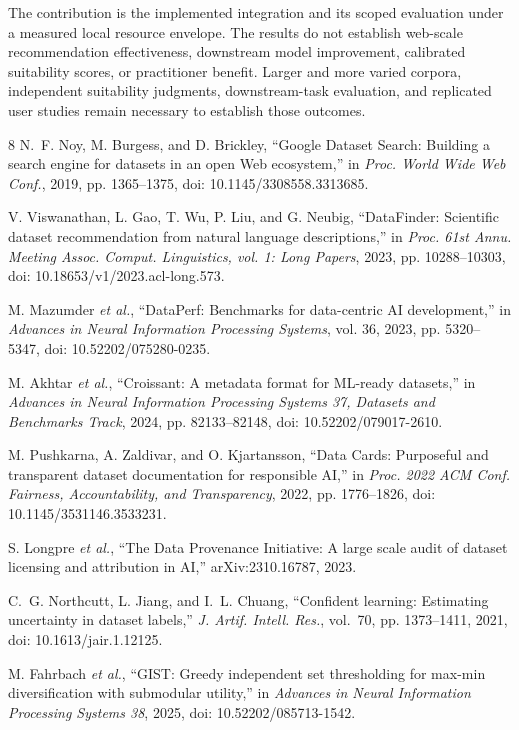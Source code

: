 \documentclass[conference]{IEEEtran}
\begin{document}
The contribution is the implemented integration and its scoped evaluation under a measured local resource envelope. The results do not establish web-scale recommendation effectiveness, downstream model improvement, calibrated suitability scores, or practitioner benefit. Larger and more varied corpora, independent suitability judgments, downstream-task evaluation, and replicated user studies remain necessary to establish those outcomes.

\begin{thebibliography}{8}
N.~F. Noy, M. Burgess, and D. Brickley, ``Google Dataset Search: Building a
search engine for datasets in an open Web ecosystem,'' in \emph{Proc. World
Wide Web Conf.}, 2019, pp. 1365--1375, doi: 10.1145/3308558.3313685.

V. Viswanathan, L. Gao, T. Wu, P. Liu, and G. Neubig, ``DataFinder:
Scientific dataset recommendation from natural language descriptions,'' in
\emph{Proc. 61st Annu. Meeting Assoc. Comput. Linguistics, vol. 1: Long
Papers}, 2023, pp. 10288--10303, doi: 10.18653/v1/2023.acl-long.573.

M. Mazumder \emph{et al.}, ``DataPerf: Benchmarks for data-centric AI
development,'' in \emph{Advances in Neural Information Processing Systems},
vol. 36, 2023, pp. 5320--5347, doi: 10.52202/075280-0235.

M. Akhtar \emph{et al.}, ``Croissant: A metadata format for ML-ready
datasets,'' in \emph{Advances in Neural Information Processing Systems 37,
Datasets and Benchmarks Track}, 2024, pp. 82133--82148, doi:
10.52202/079017-2610.

M. Pushkarna, A. Zaldivar, and O. Kjartansson, ``Data Cards: Purposeful and
transparent dataset documentation for responsible AI,'' in \emph{Proc. 2022
ACM Conf. Fairness, Accountability, and Transparency}, 2022, pp. 1776--1826,
doi: 10.1145/3531146.3533231.

S. Longpre \emph{et al.}, ``The Data Provenance Initiative: A large scale
audit of dataset licensing and attribution in AI,'' arXiv:2310.16787, 2023.

C.~G. Northcutt, L. Jiang, and I.~L. Chuang, ``Confident learning: Estimating
uncertainty in dataset labels,'' \emph{J. Artif. Intell. Res.}, vol.~70,
pp. 1373--1411, 2021, doi: 10.1613/jair.1.12125.

M. Fahrbach \emph{et al.}, ``GIST: Greedy independent set thresholding for
max-min diversification with submodular utility,'' in \emph{Advances in
Neural Information Processing Systems 38}, 2025, doi: 10.52202/085713-1542.
\end{thebibliography}
\end{document}
